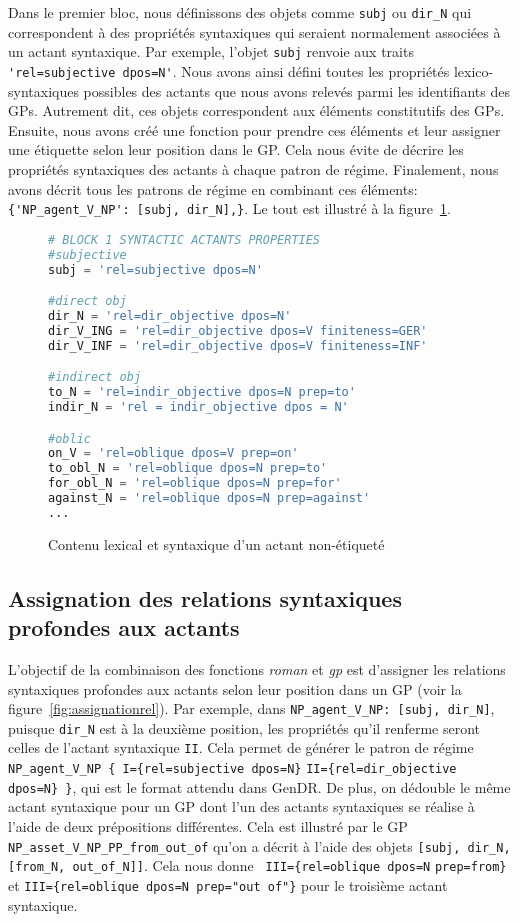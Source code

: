 Dans le premier bloc, nous définissons des objets comme \texttt{subj} ou \texttt{dir\_N} qui correspondent à des propriétés syntaxiques qui seraient normalement associées à un actant syntaxique. Par exemple, l'objet \texttt{subj} renvoie aux traits \lstinline|'rel=subjective dpos=N'|. Nous avons ainsi défini toutes les propriétés lexico-syntaxiques possibles des actants que nous avons relevés parmi les identifiants des \acp{GP}. Autrement dit, ces objets correspondent aux éléments constitutifs des \acp{GP}. Ensuite, nous avons créé une fonction pour prendre ces éléments et leur assigner une étiquette selon leur position dans le \ac{GP}. Cela nous évite de décrire les propriétés syntaxiques des actants à chaque patron de régime. Finalement, nous avons décrit tous les patrons de régime en combinant ces éléments: \lstinline|{'NP_agent_V_NP': [subj, dir_N],}|. Le tout est illustré à la figure~\ref{fig:contenulexical}.

\begin{figure}[htb]
\begin{lstlisting}[language=Python]
# BLOCK 1 SYNTACTIC ACTANTS PROPERTIES
#subjective
subj = 'rel=subjective dpos=N'

#direct obj
dir_N = 'rel=dir_objective dpos=N'
dir_V_ING = 'rel=dir_objective dpos=V finiteness=GER'
dir_V_INF = 'rel=dir_objective dpos=V finiteness=INF'

#indirect obj
to_N = 'rel=indir_objective dpos=N prep=to'
indir_N = 'rel = indir_objective dpos = N'

#oblic
on_V = 'rel=oblique dpos=V prep=on'
to_obl_N = 'rel=oblique dpos=N prep=to' 
for_obl_N = 'rel=oblique dpos=N prep=for'
against_N = 'rel=oblique dpos=N prep=against'
...
\end{lstlisting}
  \caption{Contenu lexical et syntaxique d'un actant non-étiqueté}
	\label{fig:contenulexical}
\end{figure}

\subsection{Assignation des relations syntaxiques profondes aux actants}

L'objectif de la combinaison des fonctions \emph{roman} et \emph{gp} est d'assigner les relations syntaxiques profondes aux actants selon leur position dans un \ac{GP} (voir la figure~\ref{fig:assignationrel}). Par exemple, dans \lstinline|NP_agent_V_NP: [subj, dir_N]|, puisque \texttt{dir\_N} est à la deuxième position, les propriétés qu'il renferme seront celles de l'actant syntaxique \texttt{II}. Cela permet de générer le patron de régime \lstinline|NP_agent_V_NP { I={rel=subjective dpos=N}| \lstinline|II={rel=dir_objective dpos=N} }|, qui est le format attendu dans GenDR. De plus, on dédouble le même actant syntaxique pour un \ac{GP} dont l'un des actants syntaxiques se réalise à l'aide de deux prépositions différentes. Cela est illustré par le \ac{GP} \lstinline|NP_asset_V_NP_PP_from_out_of| qu'on a décrit à l'aide des objets \lstinline|[subj, dir_N, [from_N, out_of_N]]|. Cela nous donne \lstinline| III={rel=oblique dpos=N| \lstinline|prep=from}| et \lstinline|III={rel=oblique dpos=N prep="out of"}| pour le troisième actant syntaxique.


